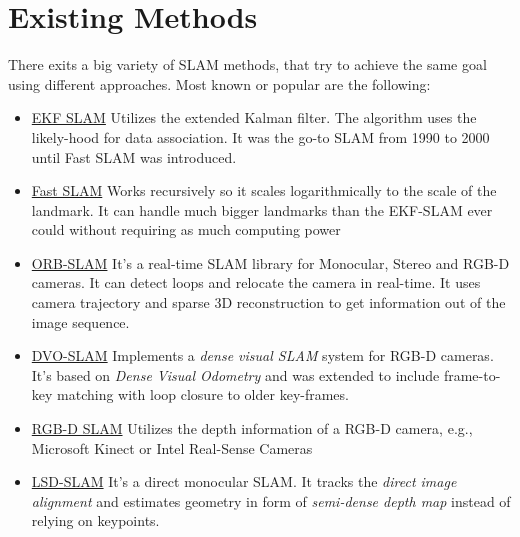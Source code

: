 \section{Existing Methods}
There exits a big variety of SLAM methods, that try to achieve the same goal using different approaches\cite{openslam}.
Most known or popular are the following:
\begin{itemize}
    \item \underline{EKF SLAM} \newline
    Utilizes the extended Kalman filter. The algorithm  uses the likely-hood for data association.
    It was the go-to SLAM from 1990 to 2000 until Fast SLAM was introduced.
    
    \item \underline{Fast SLAM} \newline
    Works recursively  so it scales logarithmically to the scale of the landmark. It can handle much bigger landmarks than the EKF-SLAM ever could without requiring as much computing power
    
    \item \underline{ORB-SLAM} \newline
    It's a real-time SLAM library for Monocular, Stereo and RGB-D cameras. It can detect loops and relocate the camera in real-time. It uses camera trajectory and sparse 3D reconstruction to get information out of the image sequence.
    
    \item \underline{DVO-SLAM} \newline
    Implements a \textit{dense visual SLAM} system for RGB-D cameras. It's based on \textit{Dense Visual Odometry} and was extended to include frame-to-key matching with loop closure to older key-frames.
    
    \item \underline{RGB-D SLAM} \newline
    Utilizes the depth information of a RGB-D camera, e.g., Microsoft Kinect or Intel Real-Sense Cameras
    
    \item \underline{LSD-SLAM} \newline
    It's a direct monocular SLAM. It tracks the \textit{direct image alignment} and estimates geometry in form of \textit{semi-dense depth map} instead of relying on keypoints.
    
    
\end{itemize}